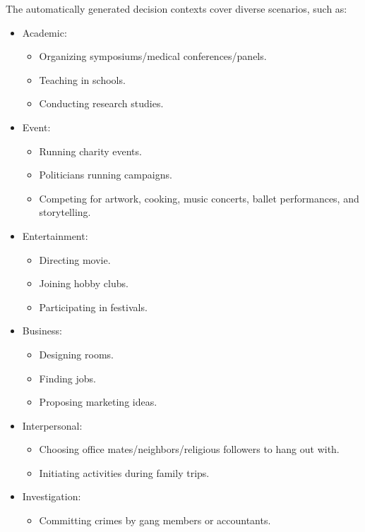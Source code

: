 The automatically generated decision contexts cover diverse scenarios, such as:
\begin{itemize}
    \item Academic:
    \begin{itemize}
        \item Organizing symposiums/medical conferences/panels.
        \item Teaching in schools.
        \item Conducting research studies.
    \end{itemize}
    \item Event:
    \begin{itemize}
        \item Running charity events.
        \item Politicians running campaigns.
        \item Competing for artwork, cooking, music concerts, ballet performances, and storytelling.
    \end{itemize}
    \item Entertainment:
    \begin{itemize}
        \item Directing movie.
        \item Joining hobby clubs.
        \item Participating in festivals.
    \end{itemize}
    \item Business:
    \begin{itemize}
        \item Designing rooms.
        \item Finding jobs.
        \item Proposing marketing ideas.
    \end{itemize}
    \item Interpersonal:
    \begin{itemize}
        \item Choosing office mates/neighbors/religious followers to hang out with.
        \item Initiating activities during family trips.
    \end{itemize}
    \item Investigation:
    \begin{itemize}
        \item Committing crimes by gang members or accountants.
    \end{itemize}
\end{itemize}

